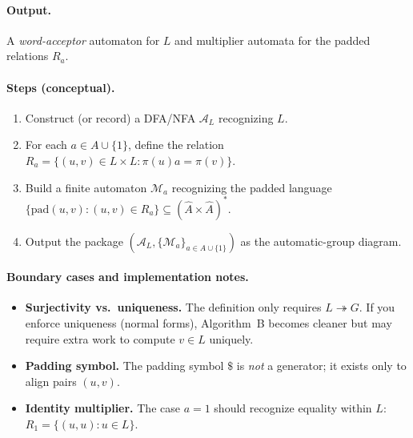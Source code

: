 \documentclass[11pt]{article}
\theoremstyle{definition}
\theoremstyle{plain}
\theoremstyle{remark}
\begin{document}
\paragraph{Output.}
A \emph{word-acceptor} automaton for $L$ and multiplier automata for the padded relations $R_a$.

\paragraph{Steps (conceptual).}
\begin{enumerate}[leftmargin=2.2em]
\item Construct (or record) a DFA/NFA $\mathcal A_L$ recognizing $L$.
\item For each $a\in A\cup\{1\}$, define the relation
$R_a=\{(u,v)\in L\times L:\pi(u)a=\pi(v)\}$.
\item Build a finite automaton $\mathcal M_a$ recognizing the padded language
$\{\mathrm{pad}(u,v):(u,v)\in R_a\}\subseteq(\widehat A\times\widehat A)^*$.
\item Output the package $(\mathcal A_L,\{\mathcal M_a\}_{a\in A\cup\{1\}})$ as the automatic-group diagram.
\end{enumerate}

\paragraph{Boundary cases and implementation notes.}
\begin{itemize}[leftmargin=2em]
\item \textbf{Surjectivity vs.\ uniqueness.} The definition only requires $L\twoheadrightarrow G$.
If you enforce uniqueness (normal forms), Algorithm~B becomes cleaner but may require extra work to compute $v\in L$ uniquely.
\item \textbf{Padding symbol.} The padding symbol $\$$ is \emph{not} a generator; it exists only to align pairs $(u,v)$.
\item \textbf{Identity multiplier.} The case $a=1$ should recognize equality within $L$: $R_1=\{(u,u):u\in L\}$.
\end{itemize}
\end{document}
